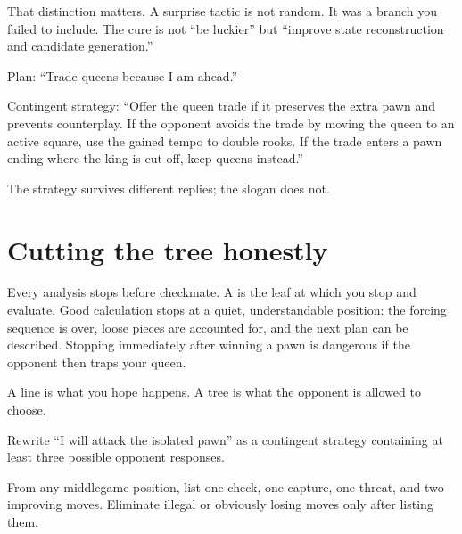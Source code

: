 That distinction matters. A surprise tactic is not random. It was a branch you failed to include. The cure is not ``be luckier'' but ``improve state reconstruction and candidate generation.''

\begin{workedbox}[title={Worked example: plan versus strategy}]
Plan: ``Trade queens because I am ahead.''

Contingent strategy: ``Offer the queen trade if it preserves the extra pawn and prevents counterplay. If the opponent avoids the trade by moving the queen to an active square, use the gained tempo to double rooks. If the trade enters a pawn ending where the king is cut off, keep queens instead.''

The strategy survives different replies; the slogan does not.
\end{workedbox}

\section{Cutting the tree honestly}
Every analysis stops before checkmate. A  is the leaf at which you stop and evaluate. Good calculation stops at a quiet, understandable position: the forcing sequence is over, loose pieces are accounted for, and the next plan can be described. Stopping immediately after winning a pawn is dangerous if the opponent then traps your queen.

\begin{memorybox}
A line is what you hope happens. A tree is what the opponent is allowed to choose.
\end{memorybox}

\begin{exercise}
Rewrite ``I will attack the isolated pawn'' as a contingent strategy containing at least three possible opponent responses.
\end{exercise}

\begin{exercise}
From any middlegame position, list one check, one capture, one threat, and two improving moves. Eliminate illegal or obviously losing moves only after listing them.
\end{exercise}


